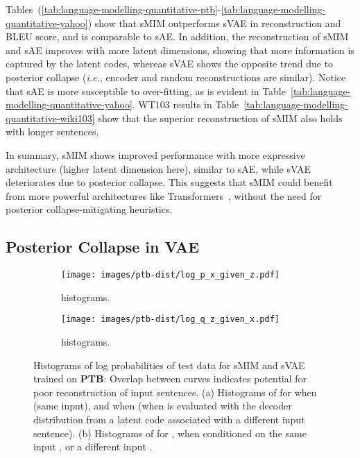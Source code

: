 \documentclass{article}
\newcommand{\ie}{{\em i.e.}}
\begin{document}
Tables\ (\ref{tab:language-modelling-quantitative-ptb}-\ref{tab:language-modelling-quantitative-yahoo}) 
show that sMIM outperforms sVAE in reconstruction and BLEU score, and is comparable to sAE.
In addition, the reconstruction of sMIM and sAE improves with more latent dimensions, showing that more information is captured by the latent codes, 
whereas sVAE shows the opposite trend due to posterior collapse (\ie, encoder and random reconstructions are similar).
Notice that sAE is more susceptible to over-fitting, as is evident in Table\ \ref{tab:language-modelling-quantitative-yahoo}.
WT103 results in Table\ \ref{tab:language-modelling-quantitative-wiki103} show that the superior reconstruction of sMIM also holds with longer sentences.

In summary, sMIM shows improved performance with more expressive architecture (higher latent dimension here), 
similar to sAE, while sVAE deteriorates due to posterior collapse.
This suggests that sMIM could benefit from more powerful architectures like Transformers~\citep{Vaswani2017}, without the need for posterior collapse-mitigating heuristics.



\subsection{Posterior Collapse in VAE} \label{sec:nlp-posterior-collapse-ptb}

\begin{figure}[t]
    \centering
    \begin{subfigure}[t]{0.5\columnwidth}
        \centering
        \texttt{[image: images/ptb-dist/log\_p\_x\_given\_z.pdf]}
        \caption{ histograms.}     
        \label{fig:nlp-dist-ptb-log_p_x_given_z}
    \end{subfigure}\begin{subfigure}[t]{0.5\columnwidth}
        \centering
        \texttt{[image: images/ptb-dist/log\_q\_z\_given\_x.pdf]}
        \caption{ histograms.}     
        \label{fig:nlp-dist-ptb-log_q_z_given_x}
    \end{subfigure}
     \vspace*{-0.25cm}
    \caption{
    Histograms of log probabilities of test data for sMIM  and 
    sVAE trained on \textbf{PTB}: Overlap between  curves indicates
    potential for poor reconstruction of input sentences.
    (a) Histograms of  for  when  
    (same input), and when  (when  is evaluated with the 
    decoder distribution from a latent code associated with a different input sentence).
    (b) Histograms of  for  , 
    when conditioned on the same input , or a different input .
    \label{fig:nlp-dist-ptb}
    }
    \vspace*{-0.5cm}
\end{figure}
\end{document}
